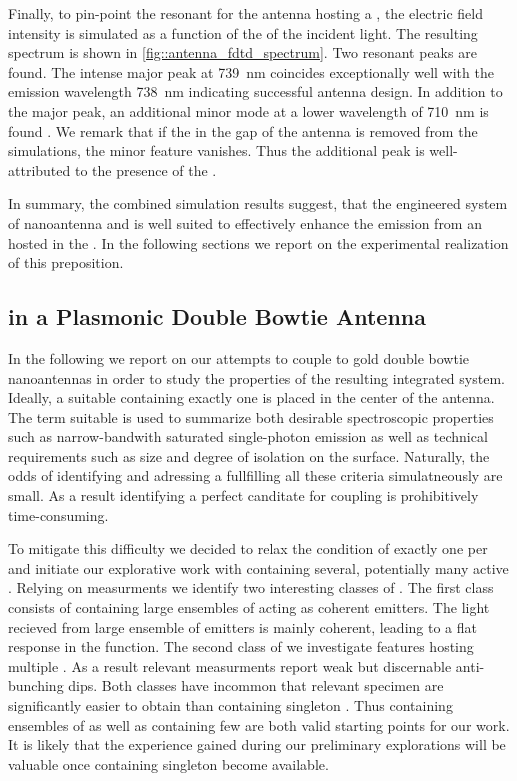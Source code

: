 		Finally, to pin-point the resonant \wl for the antenna hosting a \nd, the electric field intensity is simulated as a function of the \wl of the incident light. The resulting spectrum is shown in \autoref{fig::antenna_fdtd_spectrum}. Two resonant peaks are found. The intense major peak at \SI{739}{nm} coincides exceptionally well with the \siv emission wavelength \SI{738}{nm} indicating successful antenna design. In addition to the major peak, an additional minor mode at a lower wavelength of \SI{710}{nm} is found \cite{Rahbany2016}. We remark that if the \nd in the gap of the antenna is removed from the simulations, the minor feature vanishes. Thus the additional peak is well-attributed to the presence of the \nd.

		In summary, the combined simulation results suggest, that the engineered system of nanoantenna and \nd is well suited to effectively enhance the emission from an \siv hosted in the \nd. In the following sections we report on the experimental realization of this preposition.


	\subsection{\siv in a Plasmonic Double Bowtie Antenna}

		In the following we report on our attempts to couple \sivs to gold double bowtie nanoantennas in order to study the properties of the resulting integrated system. Ideally, a suitable \nd containing exactly one \siv is placed in the center of the antenna. The term suitable is used to summarize both desirable spectroscopic properties such as narrow-bandwith saturated single-photon emission as well as technical requirements such as \nd size and degree of isolation on the surface. Naturally, the odds of identifying and adressing a \nd fullfilling all these criteria simulatneously are small. As a result identifying a perfect canditate for coupling is prohibitively time-consuming.

		To mitigate this difficulty we decided to relax the condition of exactly one \siv per \nd and initiate our explorative work with \nds containing several, potentially many active \sivs. Relying on \gtz measurments we identify two interesting classes of \nds. The first class consists of \nds containing large ensembles of \sivs acting as coherent emitters. The \fl light recieved from large ensemble of emitters is mainly coherent, leading to a flat response in the \gtz function. The second class of \nds we investigate features \nds hosting multiple \sivs. As a result relevant \gtz measurments report weak but discernable anti-bunching dips. Both classes have incommon that relevant \nd specimen are significantly easier to obtain than \nds containing singleton \sivs. Thus \nds containing ensembles of \sivs as well as \nds containing few \sivs are both valid starting points for our work. It is likely that the experience gained during our preliminary explorations will be valuable once \nds containing singleton \sivs become available.

